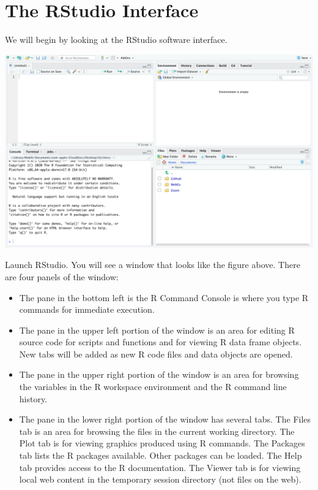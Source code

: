 \documentclass[
]{book}
\begin{document}
\hypertarget{the-rstudio-interface}{%
\section{\texorpdfstring{The \textbf{RStudio} Interface}{The RStudio Interface}}\label{the-rstudio-interface}}

We will begin by looking at the RStudio software interface.

\includegraphics[width=49.78in]{images/rstudio}

Launch RStudio. You will see a window that looks like the figure above. There are four panels of the window:

\begin{itemize}
\item
  The pane in the bottom left is the R Command Console is where you type R commands for immediate execution.
\item
  The pane in the upper left portion of the window is an area for editing R source code for scripts and functions and for viewing R data frame objects. New tabs will be added as new R code files and data objects are opened.
\item
  The pane in the upper right portion of the window is an area for browsing the variables in the R workspace environment and the R command line history.
\item
  The pane in the lower right portion of the window has several tabs. The Files tab is an area for browsing the files in the current working directory. The Plot tab is for viewing graphics produced using R commands. The Packages tab lists the R packages available. Other packages can be loaded. The Help tab provides access to the R documentation. The Viewer tab is for viewing local web content in the temporary session directory (not files on the web).
\end{itemize}
\end{document}
